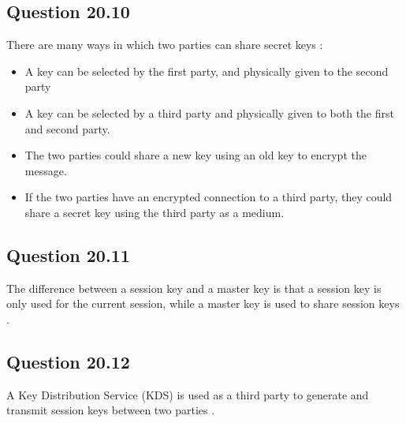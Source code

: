 \documentclass[14pt]{extarticle}
\begin{document}
\subsection{Question 20.10 \cite[p.~664]{stallings}}
There are many ways in which two parties can share secret keys \cite[p.~663]{stallings}:
\begin{itemize}
\item A key can be selected by the first party, and physically given to the second party
\item A key can be selected by a third party and physically given to both the first and second party.
\item The two parties could share a new key using an old key to encrypt the message.
\item If the two parties have an encrypted connection to a third party, they could share a secret key using the third party as a medium.
\end{itemize}
\subsection{Question 20.11 \cite[p.~664]{stallings}}
The difference between a session key and a master key is that a session key is only used for the current session, while a master key is used to share session keys \cite[p.~663]{stallings}.
\subsection{Question 20.12 \cite[p.~664]{stallings}}
A Key Distribution Service (KDS) is used as a third party to generate and transmit session keys between two parties \cite[p.~663]{stallings}.



\newpage




\end{document}
